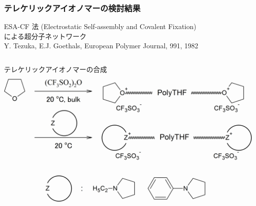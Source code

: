 \documentclass[12pt, dvipdfmx]{beamer}
\begin{document}
\begin{frame}
\frametitle{テレケリックアイオノマーの検討結果}

ESA-CF 法 (Electrostatic Self-assembly and Covalent Fixation)\\による超分子ネットワーク\\
{\scriptsize Y. Tezuka, E.J. Goethals, European Polymer Journal, 991, 1982}

\begin{columns}[T, totalwidth=\linewidth]
	{\scriptsize テレケリックアイオノマーの合成}
	\includegraphics[width=\columnwidth]{./fig/Telechelic_Anion_2.png}
	

\end{columns}
\end{frame}
\end{document}
